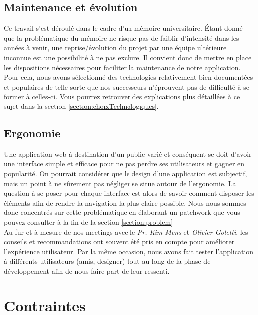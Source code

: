 \subsection*{Maintenance et évolution}

Ce travail s'est déroulé dans le cadre d'un mémoire universitaire. Étant donné que la problématique du mémoire ne risque pas de faiblir d'intensité dans les années à venir, une reprise/évolution du projet par une équipe ultérieure inconnue est une possibilité à ne pas exclure. Il convient donc de mettre en place les dispositions nécessaires pour faciliter la maintenance de notre application. \\

Pour cela, nous avons sélectionné des technologies relativement bien documentées et populaires de telle sorte que nos successeurs n'éprouvent pas de difficulté à se former à celles-ci. Vous pourrez retrouver des explications plus détaillées à ce sujet dans la section \ref{section:choixTechnologiques}.

\subsection*{Ergonomie}

Une application web à destination d'un public varié et conséquent se doit d'avoir une interface simple et efficace pour ne pas perdre ses utilisateurs et gagner en popularité. On pourrait considérer que le design d'une application est subjectif, mais un point à ne sûrement pas négliger se situe autour de l'ergonomie. La question à se poser pour chaque interface est alors de savoir comment disposer les éléments afin de rendre la navigation la plus claire possible. Nous nous sommes donc concentrés sur cette problématique en élaborant un patchwork que vous pouvez consulter à la fin de la section \ref{section:problem}\\

Au fur et à mesure de nos meetings avec le \textit{Pr. Kim Mens} et \textit{Olivier Goletti}, les conseils et recommandations ont souvent été pris en compte pour améliorer l'expérience utilisateur. Par la même occasion, nous avons fait tester l'application à différents utilisateurs (amis, designer) tout au long de la phase de développement afin de nous faire part de leur ressenti.

\pagebreak
\section {Contraintes}
\label{sec:ContraintesCdc}

